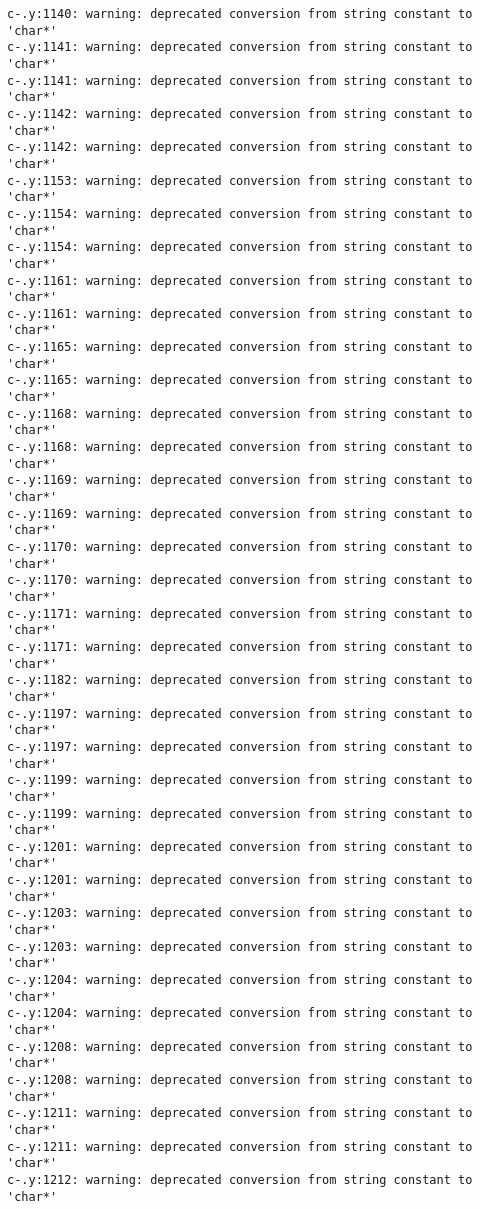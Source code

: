 \documentclass[12pt]{book}
\begin{document}
\begin{lstlisting}
c-.y:1140: warning: deprecated conversion from string constant to 'char*'
c-.y:1141: warning: deprecated conversion from string constant to 'char*'
c-.y:1141: warning: deprecated conversion from string constant to 'char*'
c-.y:1142: warning: deprecated conversion from string constant to 'char*'
c-.y:1142: warning: deprecated conversion from string constant to 'char*'
c-.y:1153: warning: deprecated conversion from string constant to 'char*'
c-.y:1154: warning: deprecated conversion from string constant to 'char*'
c-.y:1154: warning: deprecated conversion from string constant to 'char*'
c-.y:1161: warning: deprecated conversion from string constant to 'char*'
c-.y:1161: warning: deprecated conversion from string constant to 'char*'
c-.y:1165: warning: deprecated conversion from string constant to 'char*'
c-.y:1165: warning: deprecated conversion from string constant to 'char*'
c-.y:1168: warning: deprecated conversion from string constant to 'char*'
c-.y:1168: warning: deprecated conversion from string constant to 'char*'
c-.y:1169: warning: deprecated conversion from string constant to 'char*'
c-.y:1169: warning: deprecated conversion from string constant to 'char*'
c-.y:1170: warning: deprecated conversion from string constant to 'char*'
c-.y:1170: warning: deprecated conversion from string constant to 'char*'
c-.y:1171: warning: deprecated conversion from string constant to 'char*'
c-.y:1171: warning: deprecated conversion from string constant to 'char*'
c-.y:1182: warning: deprecated conversion from string constant to 'char*'
c-.y:1197: warning: deprecated conversion from string constant to 'char*'
c-.y:1197: warning: deprecated conversion from string constant to 'char*'
c-.y:1199: warning: deprecated conversion from string constant to 'char*'
c-.y:1199: warning: deprecated conversion from string constant to 'char*'
c-.y:1201: warning: deprecated conversion from string constant to 'char*'
c-.y:1201: warning: deprecated conversion from string constant to 'char*'
c-.y:1203: warning: deprecated conversion from string constant to 'char*'
c-.y:1203: warning: deprecated conversion from string constant to 'char*'
c-.y:1204: warning: deprecated conversion from string constant to 'char*'
c-.y:1204: warning: deprecated conversion from string constant to 'char*'
c-.y:1208: warning: deprecated conversion from string constant to 'char*'
c-.y:1208: warning: deprecated conversion from string constant to 'char*'
c-.y:1211: warning: deprecated conversion from string constant to 'char*'
c-.y:1211: warning: deprecated conversion from string constant to 'char*'
c-.y:1212: warning: deprecated conversion from string constant to 'char*'

\end{lstlisting}
\end{document}
